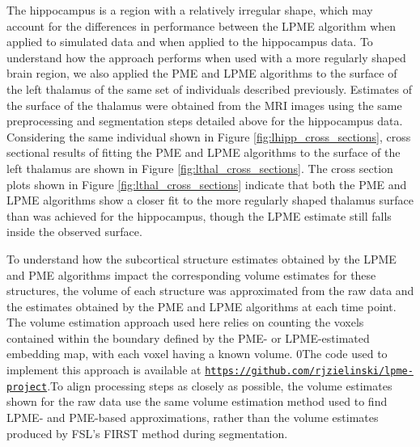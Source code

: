 \documentclass[12pt]{article}
\newcommand{\blind}{0}
\theoremstyle{definition}
\begin{document}
The hippocampus is a region with a relatively irregular shape, which may account for the differences in performance between the LPME algorithm when applied to simulated data and when applied to the hippocampus data. To understand how the approach performs when used with a more regularly shaped brain region, we also applied the PME and LPME algorithms to the surface of the left thalamus of the same set of individuals described previously. Estimates of the surface of the thalamus were obtained from the MRI images using the same preprocessing and segmentation steps detailed above for the hippocampus data. Considering the same individual shown in Figure \ref{fig:lhipp_cross_sections}, cross sectional results of fitting the PME and LPME algorithms to the surface of the left thalamus are shown in Figure \ref{fig:lthal_cross_sections}. The cross section plots shown in Figure \ref{fig:lthal_cross_sections} indicate that both the PME and LPME algorithms show a closer fit to the more regularly shaped thalamus surface than was achieved for the hippocampus, though the LPME estimate still falls inside the observed surface.

To understand how the subcortical structure estimates obtained by the LPME and PME algorithms impact the corresponding volume estimates for these structures, the volume of each structure was approximated from the raw data and the estimates obtained by the PME and LPME algorithms at each time point. The volume estimation approach used here relies on counting the voxels contained within the boundary defined by the PME- or LPME-estimated embedding map, with each voxel having a known volume. \blind{The code used to implement this approach is available at \href{https://github.com/rjzielinski/lpme-project}{\texttt{https://github.com/rjzielinski/lpme-project}}.}\fi To align processing steps as closely as possible, the volume estimates shown for the raw data use the same volume estimation method used to find LPME- and PME-based approximations, rather than the volume estimates produced by FSL's FIRST method during segmentation.
\end{document}
